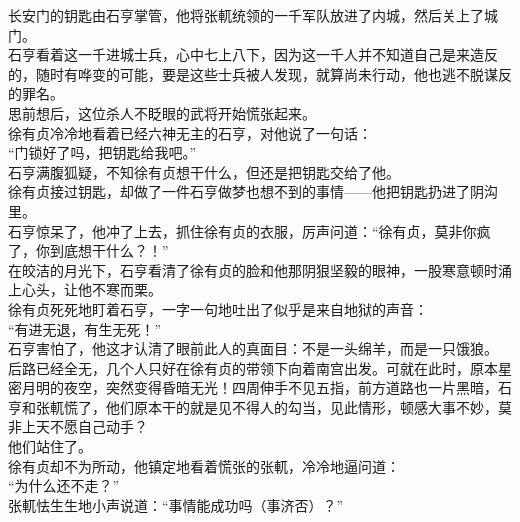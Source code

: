 \begin{multicols}{\theparacolNo}
长安门的钥匙由石亨掌管，他将张軏统领的一千军队放进了内城，然后关上了城门。\\

石亨看着这一千进城士兵，心中七上八下，因为这一千人并不知道自己是来造反的，随时有哗变的可能，要是这些士兵被人发现，就算尚未行动，他也逃不脱谋反的罪名。\\

思前想后，这位杀人不眨眼的武将开始慌张起来。\\

徐有贞冷冷地看着已经六神无主的石亨，对他说了一句话：\\

“门锁好了吗，把钥匙给我吧。”\\

石亨满腹狐疑，不知徐有贞想干什么，但还是把钥匙交给了他。\\

徐有贞接过钥匙，却做了一件石亨做梦也想不到的事情——他把钥匙扔进了阴沟里。\\

石亨惊呆了，他冲了上去，抓住徐有贞的衣服，厉声问道：“徐有贞，莫非你疯了，你到底想干什么？！”\\

在皎洁的月光下，石亨看清了徐有贞的脸和他那阴狠坚毅的眼神，一股寒意顿时涌上心头，让他不寒而栗。\\

徐有贞死死地盯着石亨，一字一句地吐出了似乎是来自地狱的声音：\\

“有进无退，有生无死！”\\

石亨害怕了，他这才认清了眼前此人的真面目：不是一头绵羊，而是一只饿狼。\\

后路已经全无，几个人只好在徐有贞的带领下向着南宫出发。可就在此时，原本星密月明的夜空，突然变得昏暗无光！四周伸手不见五指，前方道路也一片黑暗，石亨和张軏慌了，他们原本干的就是见不得人的勾当，见此情形，顿感大事不妙，莫非上天不愿自己动手？\\

他们站住了。\\

徐有贞却不为所动，他镇定地看着慌张的张軏，冷冷地逼问道：\\

“为什么还不走？”\\

张軏怯生生地小声说道：“事情能成功吗（事济否）？”\\


\end{multicols}
